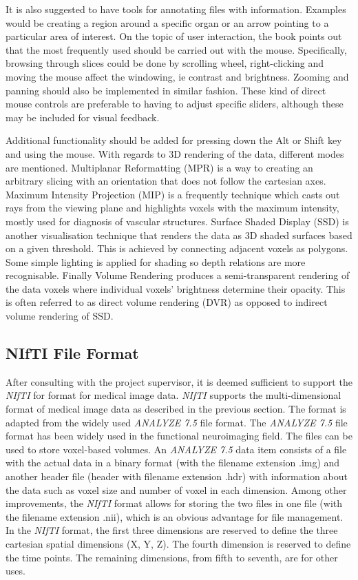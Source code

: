 \documentclass[a4paper,11pt,titlepage]{article}
\begin{document}
It is also suggested to have tools for annotating files with information. Examples would be creating a region around a specific organ or an arrow pointing to a particular area of interest.
On the topic of user interaction, the book points out that the most frequently used should be carried out with the mouse. Specifically, browsing through slices could be done by scrolling wheel, right-clicking and moving the mouse affect the windowing, ie contrast and brightness. Zooming and panning should also be implemented in similar fashion. These kind of direct mouse controls are preferable to having to adjust specific sliders, although these may be included for visual feedback.

Additional functionality should be added for pressing down the Alt or Shift key and using the mouse.
With regards to 3D rendering of the data, different modes are mentioned. Multiplanar Reformatting (MPR) is a way to creating an arbitrary slicing with an orientation that does not follow the cartesian axes. Maximum Intensity Projection (MIP) is a frequently technique which casts out rays from the viewing plane and highlights voxels with the maximum intensity, mostly used for diagnosis of vascular structures. Surface Shaded Display (SSD) is another visualisation technique that renders the data as 3D shaded surfaces based on a  given threshold. This is achieved by connecting adjacent voxels as polygons. Some simple lighting is applied for shading so depth relations are more recognisable. Finally Volume Rendering produces a semi-transparent rendering of the data voxels where individual voxels' brightness determine their opacity. This is often referred to as direct volume rendering (DVR) as opposed to indirect volume rendering of SSD.

\subsection{NIfTI File Format}

After consulting with the project supervisor, it is deemed sufficient to support the \textit{NIfTI} for format for medical image data. \textit{NIfTI} supports the multi-dimensional format of medical image data as described in the previous section. The format is adapted from the widely used \textit{ANALYZE 7.5} file format. The \textit{ANALYZE 7.5} file format has been widely used in the functional neuroimaging field. The files can be used to store voxel-based volumes. An \textit{ANALYZE 7.5} data item consists of a file with the actual data in a binary format (with the filename extension .img) and another header file (header with filename extension .hdr) with information about the data such as voxel size and number of voxel in each dimension. Among other improvements, the \textit{NIfTI} format allows for storing the two files in one file (with the filename extension .nii), which is an obvious advantage for file management.
In the \textit{NIfTI} format, the first three dimensions are reserved to define the three cartesian spatial dimensions (X, Y, Z). The fourth dimension is reserved to define the time points. The remaining dimensions, from fifth to seventh, are for other uses. 
\end{document}
